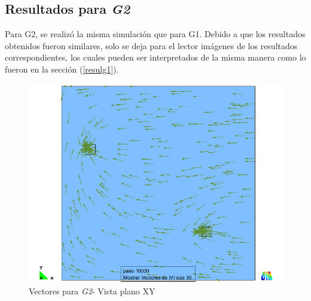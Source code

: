 \documentclass[10pt,a4paper,final]{article}
\begin{document}
\subsection{Resultados para \emph{G2}}
Para G2, se realizó la misma simulación que para G1. Debido a que los resultados obtenidos fueron similares, solo se deja para el lector imágenes de los resultados correspondientes, los cuales pueden ser interpretados de la misma manera como lo fueron en la sección (\ref{resulg1}).
%
\begin{figure}[H]
\centerline{\includegraphics[scale=0.4]{img/200m/resul/200_xy_vectores}}
\caption{Vectores para \emph{G2}- Vista plano XY}
\label{200_xy_vectores}
\end{figure}
%
\end{document}
